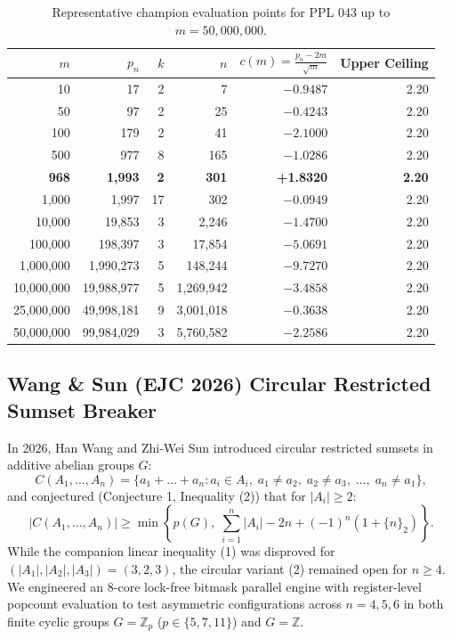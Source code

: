 \documentclass[11pt,a4paper]{article}
\theoremstyle{definition}
\theoremstyle{remark}
\begin{document}
\begin{table}[htbp]
\centering
\small
\caption{Representative champion evaluation points for PPL 043 up to $m = 50,000,000$.}
\label{tab:ppl043_champions}
\begin{tabular}{rrrrrr}
\toprule
$m$ & $p_n$ & $k$ & $n$ & $c(m) = \frac{p_n - 2m}{\sqrt{m}}$ & Upper Ceiling \\
\midrule
10         & 17         & 2  & 7         & $-0.9487$ & 2.20 \\
50         & 97         & 2  & 25        & $-0.4243$ & 2.20 \\
100        & 179        & 2  & 41        & $-2.1000$ & 2.20 \\
500        & 977        & 8  & 165       & $-1.0286$ & 2.20 \\
\textbf{968} & \textbf{1,993} & \textbf{2} & \textbf{301} & \textbf{+1.8320} & \textbf{2.20} \\
1,000      & 1,997      & 17 & 302       & $-0.0949$ & 2.20 \\
10,000     & 19,853     & 3  & 2,246     & $-1.4700$ & 2.20 \\
100,000    & 198,397    & 3  & 17,854    & $-5.0691$ & 2.20 \\
1,000,000  & 1,990,273  & 5  & 148,244   & $-9.7270$ & 2.20 \\
10,000,000 & 19,988,977 & 5  & 1,269,942 & $-3.4858$ & 2.20 \\
25,000,000 & 49,998,181 & 9  & 3,001,018 & $-0.3638$ & 2.20 \\
50,000,000 & 99,984,029 & 3  & 5,760,582 & $-2.2586$ & 2.20 \\
\bottomrule
\end{tabular}
\end{table}

\subsection{Wang \& Sun (EJC 2026) Circular Restricted Sumset Breaker}
In 2026, Han Wang and Zhi-Wei Sun \cite{wangsun2026} introduced circular restricted sumsets in additive abelian groups $G$:
\begin{equation}
C(A_1, \dots, A_n) = \{a_1 + \dots + a_n : a_i \in A_i, \; a_1 \neq a_2, \; a_2 \neq a_3, \; \dots, \; a_n \neq a_1\},
\end{equation}
and conjectured (Conjecture 1, Inequality (2)) that for $|A_i| \ge 2$:
\begin{equation}
|C(A_1, \dots, A_n)| \ge \min\left\{p(G), \; \sum_{i=1}^n |A_i| - 2n + (-1)^n(1 + \{n\}_2)\right\}.
\end{equation}
While the companion linear inequality (1) was disproved for $(|A_1|, |A_2|, |A_3|) = (3, 2, 3)$, the circular variant (2) remained open for $n \ge 4$. We engineered an 8-core lock-free bitmask parallel engine with register-level popcount evaluation to test asymmetric configurations across $n = 4, 5, 6$ in both finite cyclic groups $G = \mathbb{Z}_p$ ($p \in \{5, 7, 11\}$) and $G = \mathbb{Z}$.
\end{document}
